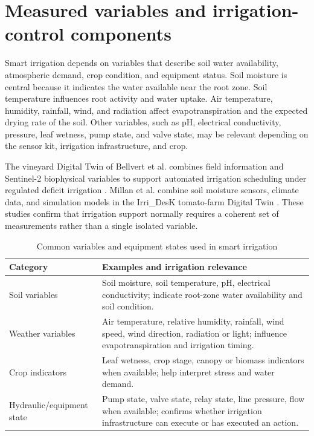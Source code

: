 \section{Measured variables and irrigation-control components}

Smart irrigation depends on variables that describe soil water availability, atmospheric demand, crop condition, and equipment status. Soil moisture is central because it indicates the water available near the root zone. Soil temperature influences root activity and water uptake. Air temperature, humidity, rainfall, wind, and radiation affect evapotranspiration and the expected drying rate of the soil. Other variables, such as pH, electrical conductivity, pressure, leaf wetness, pump state, and valve state, may be relevant depending on the sensor kit, irrigation infrastructure, and crop.

The vineyard Digital Twin of Bellvert et al. combines field information and Sentinel-2 biophysical variables to support automated irrigation scheduling under regulated deficit irrigation \cite{bellvert2023vineyarddt}. Millan et al. combine soil moisture sensors, climate data, and simulation models in the Irri\_DesK tomato-farm Digital Twin \cite{millan2025tomatodt}. These studies confirm that irrigation support normally requires a coherent set of measurements rather than a single isolated variable.

\begin{table}[H]
\centering
\small
\caption{Common variables and equipment states used in smart irrigation}
\label{tab:background_irrigation_variables}
\begin{tabular}{p{}p{}}
\hline
\textbf{Category} & \textbf{Examples and irrigation relevance} \\
\hline
Soil variables & Soil moisture, soil temperature, pH, electrical conductivity; indicate root-zone water availability and soil condition. \\
Weather variables & Air temperature, relative humidity, rainfall, wind speed, wind direction, radiation or light; influence evapotranspiration and irrigation timing. \\
Crop indicators & Leaf wetness, crop stage, canopy or biomass indicators when available; help interpret stress and water demand. \\
Hydraulic/equipment state & Pump state, valve state, relay state, line pressure, flow when available; confirms whether irrigation infrastructure can execute or has executed an action. \\
\hline
\end{tabular}
\end{table}

